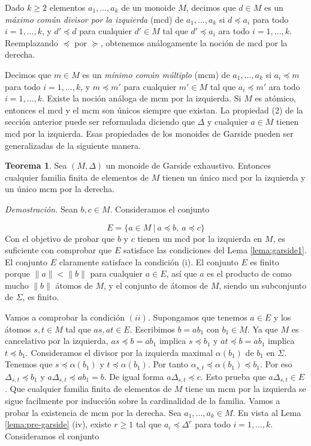 \documentclass[12pt]{article}
\theoremstyle{definition}
\newtheorem{teor}{Teorema}[section]
\providecommand{\norm}[1]{\lVert#1\rVert}
\begin{document}
Dado $k\geq 2$ elementos $a_1,\ldots,a_k$ de un monoide $M$, decimos que $d\in M$ es un \textit{máximo común divisor por la izquierda} (mcd) de $a_1,\ldots,a_k$ si $d\preceq a_i$ para todo $i=1,\ldots,k$, y $d'\preceq d$ para cualquier $d'\in M$ tal que $d'\preceq a_i$ ara todo $i=1,\ldots,k$. Reemplazando $\preceq$ por $\succeq$, obtenemos análogamente la noción de mcd por la derecha.

Decimos que $m\in M$ es un \textit{mínimo común múltiplo} (mcm) de $a_1,\ldots,a_k$ si $a_i\preceq m$ para todo $i=1,\ldots,k$, y $m\preceq m'$ para cualquier $m'\in M$ tal que $a_i\preceq m'$ ara todo $i=1,\ldots,k$. Existe la noción análoga de mcm por la izquierda. Si $M$ es atómico, entonces el mcd y el mcm son únicos siempre que existan. La propiedad (2) de la sección anterior puede ser reformulada diciendo que $\Delta$ y cualquier $a\in M$ tienen mcd por la izquierda. Esas propiedades de los monoides de Garside pueden ser generalizadas de la siguiente manera.

\begin{teor}
Sea $(M,\Delta)$ un monoide de Garside exhaustivo. Entonces cualquier familia finita de elementos de $M$ tienen un único mcd por la izquierda y un único mcm por la derecha.
\end{teor}

\textit{Demostración.} Sean $b,c\in M$. Consideramos el conjunto

$$E=\{a\in M\ |\ a\preceq b,\ a\preceq c\}$$
\newline
Con el objetivo de probar que $b$ y $c$ tienen un mcd por la izquierda en $M$, es suficiente con comprobar que $E$ satisface las condiciones del Lema \ref{lema:garside1}. El conjunto $E$ claramente satisface la condición (i). El conjunto $E$ es finito porque $\norm{a}<\norm{b}$ para cualquier $a\in E$, así que $a$ es el producto de como mucho $\norm{b}$ átomos de $M$, y el conjunto de átomos de $M$, siendo un subconjunto de $\Sigma$, es finito.

Vamos a comprobar la condición $(ii)$. Supongamos que tenemos $a\in E$ y los átomos $s,t\in M$ tal que $as,at\in E$. Escribimos $b=ab_1$ con $b_1\in M$. Ya que $M$ es cancelativo por la izquierda, $as\preceq b =ab_1$ implica $s\preceq b_1$ y $at\preceq b = ab_1$ implica $t\preceq b_1$. Consideramos el divisor por la izquierda maximal $\alpha(b_1)$ de $b_1$ en $\Sigma$. Tenemos que $s\preceq\alpha(b_1)$ y $t\preceq\alpha(b_1)$. Por tanto $\alpha_{s,t}\preceq \alpha(b_1)\preceq b_1$. Por eso $\Delta_{s,t}\preceq b_1$ y $a\Delta_{s,t}\preceq ab_1= b$. De igual forma $a\Delta_{s,t}\preceq c$. Esto prueba que $a\Delta_{s,t}\in E$.
\newline
\newline
Que cualquier familia finita de elementos de $M$ tiene un mcm por la izquierda se sigue facilmente por inducción sobre la cardinalidad de la familia.
\newline
\newline
Vamos a probar la existencia de mcm por la derecha. Sea $a_1,\ldots,a_k\in M$. En vista al Lema \ref{lema:pre-garside} (iv), existe $r\geq 1$ tal que $a_i\preceq\Delta^r$ para todo $i=1,\ldots,k$. Consideramos el conjunto
\end{document}
